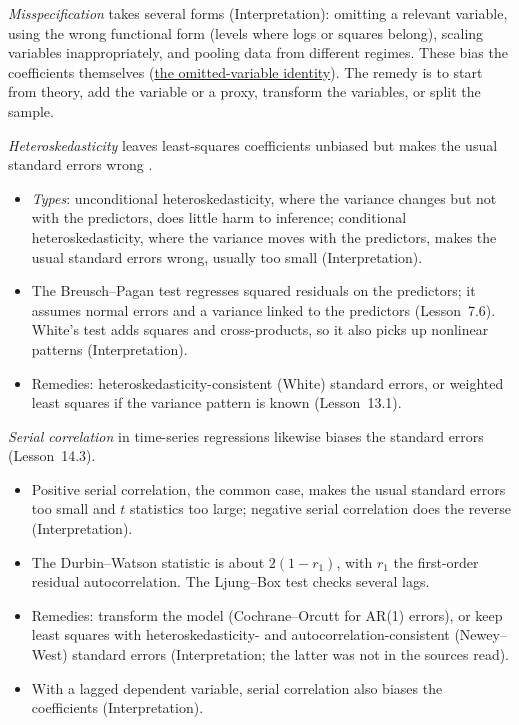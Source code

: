 \begin{qfmethod}\label{meth:regression-misspecification}
 \emph{Misspecification} takes several forms (Interpretation): omitting a relevant variable, using the wrong functional form (levels where logs or squares belong), scaling variables inappropriately, and pooling data from different regimes. These bias the coefficients themselves (\hyperref[meth:multiple-regression-formulation]{the omitted-variable identity}). The remedy is to start from theory, add the variable or a proxy, transform the variables, or split the sample.

\emph{Heteroskedasticity} leaves least-squares coefficients unbiased but makes the usual standard errors wrong \citep[Lessons~7.6, 13.1]{regression-methods-course-notes}.
\begin{itemize}
\item \emph{Types}: unconditional heteroskedasticity, where the variance changes but not with the predictors, does little harm to inference; conditional heteroskedasticity, where the variance moves with the predictors, makes the usual standard errors wrong, usually too small (Interpretation).
\item The Breusch--Pagan test regresses squared residuals on the predictors; it assumes normal errors and a variance linked to the predictors (Lesson~7.6). White's test adds squares and cross-products, so it also picks up nonlinear patterns (Interpretation).
\item Remedies: heteroskedasticity-consistent (White) standard errors, or weighted least squares if the variance pattern is known (Lesson~13.1).
\end{itemize}

\emph{Serial correlation} in time-series regressions likewise biases the standard errors (Lesson~14.3).
\begin{itemize}
\item Positive serial correlation, the common case, makes the usual standard errors too small and $t$ statistics too large; negative serial correlation does the reverse (Interpretation).
\item The Durbin--Watson statistic is about $2(1-r_1)$, with $r_1$ the first-order residual autocorrelation. The Ljung--Box test checks several lags.
\item Remedies: transform the model (Cochrane--Orcutt for AR(1) errors), or keep least squares with heteroskedasticity- and autocorrelation-consistent (Newey--West) standard errors (Interpretation; the latter was not in the sources read).
\item With a lagged dependent variable, serial correlation also biases the coefficients (Interpretation).
\end{itemize}


\end{qfmethod}
